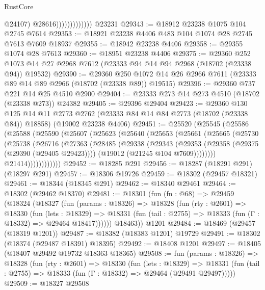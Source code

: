 \begin{lexlean}{RustCore}
\begin{coremodule}
                                @24107)
                              @28616)))))))))))))
    @23231
@29343 := @18912 @23238 @1075 @104 @2745 @7614
@29353 := @18921 @23238 @4406 @483 @104 @1074 @28 @2745 @7613 @7609 @18937
@29355 := @18942 @23238 @4406
@29358 := @29355 @1074 @28 @7613
@29360 := @18951 @23238 @4406
@29375 := @29360
    @252
    @1073
    @14
    @27
    @2968
    @7612
    (@23333 @94 @14 @94 @2968 (@18702 (@23338 @94)) @19532)
@29390 := @29360
    @250
    @1072
    @14
    @26
    @2966
    @7611
    (@23333 @89 @14 @89 @2966 (@18702 (@23338 @89)) @19515)
@29396 := @29360 @737 @221 @14 @25 @4510 @2900
@29404 := @23333 @273 @14 @273 @4510 (@18702 (@23338 @273)) @24382
@29405 := @29396 @29404
@29423 := @29360
    @130
    @125
    @14
    @11
    @2773
    @2762
    (@23333 @84 @14 @84 @2773 (@18702 (@23338 @84)) @18858)
    (@19002 @23238 @4406)
@29451 := @25520
    (@25545
      (@25586
        (@25588
          (@25590
            (@25607
              (@25623
                (@25640
                  (@25653
                    (@25661
                      (@25665
                        (@25730
                          (@25738
                            (@26716
                              (@27363
                                (@28485
                                  (@29338
                                    (@29343
                                      (@29353
                                        (@29358 (@29375 (@29390 (@29405 @29423))))
                                        (@19012 (@21245 @104 @7609))))))))
                            @21414))))))))))))
@29452 := @18285 @291
@29456 := @18287 (@18291 @291) (@18297 @291)
@29457 := @18306 @19726
@29459 := @18302 (@29457 @18321)
@29461 := @18344 (@18345 @291)
@29462 := @18340 @29461
@29464 := @18302 (@29462 @18370)
@29481 := @18301
    (fun (fn : @68) =>
    @29459
      (@18324
        (@18327
          (fun (params : @18326) =>
          @18328
            (fun (rty : @2601) =>
            @18330
              (fun (lets : @18329) =>
              @18331 (fun (tail : @2755) => @18333 (fun (Γ : @18332) => @29464 @18417))))))
        @18463))
    @1201
@29484 := @18469 (@29457 (@18319 @1201))
@29487 := @18382 (@18383 @1201) @19729
@29491 := @18302 (@18374 (@29487 @18391) @18395)
@29492 := @18408 @1201
@29497 := @18405 (@18407 @29492 @19732 @18363 @18365)
@29508 := fun (params : @18326) =>
  @18328
    (fun (rty : @2601) =>
    @18330
      (fun (lets : @18329) =>
      @18331 (fun (tail : @2755) => @18333 (fun (Γ : @18332) => @29464 (@29491 @29497)))))
@29509 := @18327 @29508

\end{coremodule}
\end{lexlean}
